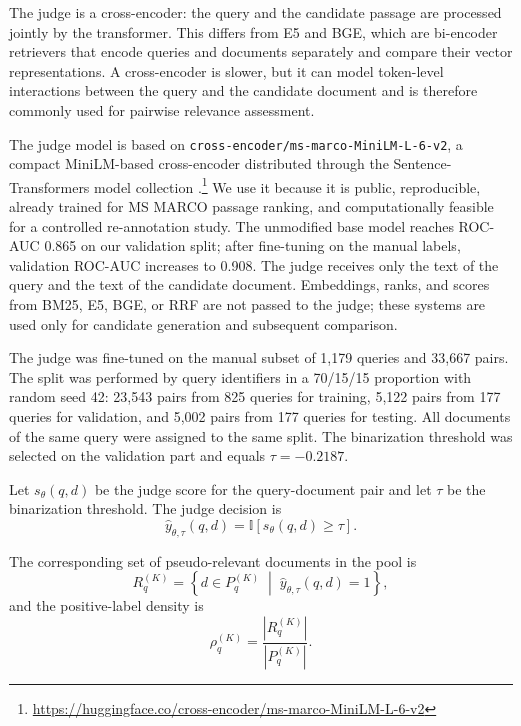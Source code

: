 \documentclass[runningheads,a4paper]{llncs}
\begin{document}
The judge is a cross-encoder: the query and the candidate passage are processed jointly by the transformer. This differs from E5 and BGE, which are bi-encoder retrievers that encode queries and documents separately and compare their vector representations. A cross-encoder is slower, but it can model token-level interactions between the query and the candidate document and is therefore commonly used for pairwise relevance assessment.

The judge model is based on \texttt{cross-encoder/ms-marco-MiniLM-L-6-v2}, a compact MiniLM-based cross-encoder distributed through the Sentence-Transformers model collection \cite{wang2020minilm,reimers2019sentencebert}.\footnote{\url{https://huggingface.co/cross-encoder/ms-marco-MiniLM-L-6-v2}} We use it because it is public, reproducible, already trained for MS MARCO passage ranking, and computationally feasible for a controlled re-annotation study. The unmodified base model reaches ROC-AUC 0.865 on our validation split; after fine-tuning on the manual labels, validation ROC-AUC increases to 0.908. The judge receives only the text of the query and the text of the candidate document. Embeddings, ranks, and scores from BM25, E5, BGE, or RRF are not passed to the judge; these systems are used only for candidate generation and subsequent comparison.

The judge was fine-tuned on the manual subset of 1,179 queries and 33,667 pairs. The split was performed by query identifiers in a 70/15/15 proportion with random seed 42: 23,543 pairs from 825 queries for training, 5,122 pairs from 177 queries for validation, and 5,002 pairs from 177 queries for testing. All documents of the same query were assigned to the same split. The binarization threshold was selected on the validation part and equals $\tau=-0.2187$.

Let $s_\theta(q,d)$ be the judge score for the query-document pair and let $\tau$ be the binarization threshold. The judge decision is
\begin{equation}
\label{eq:judge}
\hat y_{\theta,\tau}(q,d) = \mathbb{I}\left[s_\theta(q,d) \ge \tau\right].
\end{equation}

The corresponding set of pseudo-relevant documents in the pool is
\begin{equation}
\label{eq:positive-set}
R_q^{(K)} = \left\{ d \in P_q^{(K)} \; \middle| \; \hat y_{\theta,\tau}(q,d) = 1 \right\},
\end{equation}
and the positive-label density is
\begin{equation}
\label{eq:density}
\rho_q^{(K)} = \frac{|R_q^{(K)}|}{|P_q^{(K)}|}.
\end{equation}
\end{document}
